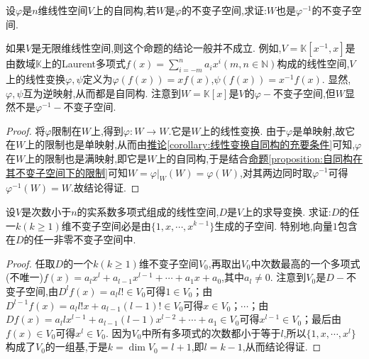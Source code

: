\documentclass[../../main.tex]{subfiles}%
\begin{document}
\begin{proposition}\label{proposition:可逆线性变换的不变子空间仍是其逆的不变子空间}
设\(\varphi\)是\(n\)维线性空间\(V\)上的自同构,若\(W\)是\(\varphi\)的不变子空间,求证:\(W\)也是\(\varphi^{-1}\)的不变子空间.
\end{proposition}
\begin{remark}
如果\(V\)是无限维线性空间,则这个命题的结论一般并不成立. 例如,\(V = \mathbb{K}[x^{-1},x]\)是由数域\(\mathbb{K}\)上的Laurent多项式\(f(x)=\sum_{i = -m}^{n}a_ix^i(m,n\in\mathbb{N})\)构成的线性空间,\(V\)上的线性变换\(\varphi,\psi\)定义为\(\varphi(f(x)) = xf(x)\),\(\psi(f(x)) = x^{-1}f(x)\). 显然,\(\varphi,\psi\)互为逆映射,从而都是自同构. 注意到\(W = \mathbb{K}[x]\)是\(V\)的\(\varphi -\)不变子空间,但\(W\)显然不是\(\varphi^{-1}-\)不变子空间.
\end{remark}
\begin{proof}

将\(\varphi\)限制在\(W\)上,得到$\varphi :W\rightarrow W$.它是\(W\)上的线性变换. 由于\(\varphi\)是单映射,故它在\(W\)上的限制也是单映射,从而由\hyperref[corollary:线性变换自同构的充要条件]{推论\ref{corollary:线性变换自同构的充要条件}}可知,\(\varphi\)在\(W\)上的限制也是满映射,即它是\(W\)上的自同构,于是结合\hyperref[proposition:自同构在其不变子空间下的限制]{命题\ref{proposition:自同构在其不变子空间下的限制}}可知\(W=\varphi |_W\left( W \right) =\varphi \left( W \right) \),对其两边同时取$\varphi ^{-1}$可得$\varphi ^{-1}\left( W \right) =W$.故结论得证.

\end{proof}

\begin{example}
设\(V\)是次数小于\(n\)的实系数多项式组成的线性空间,\(D\)是\(V\)上的求导变换. 求证:\(D\)的任一\(k(k\geqslant  1)\)维不变子空间必是由\(\{1,x,\cdots,x^{k - 1}\}\)生成的子空间. 特别地,向量\(1\)包含在\(D\)的任一非零不变子空间中.
\end{example}
\begin{proof}

任取\(D\)的一个\(k(k\geqslant  1)\)维不变子空间\(V_0\),再取出\(V_0\)中次数最高的一个多项式(不唯一)\(f(x)=a_lx^l + a_{l - 1}x^{l - 1}+\cdots + a_1x + a_0\),其中\(a_l\neq 0\). 注意到\(V_0\)是\(D -\)不变子空间,由\(D^lf(x)=a_ll!\in V_0\)可得\(1\in V_0\)；由\(D^{l - 1}f(x)=a_ll!x + a_{l - 1}(l - 1)!\in V_0\)可得\(x\in V_0\)；\(\cdots\)；由\(Df(x)=a_llx^{l - 1}+a_{l - 1}(l - 1)x^{l - 2}+\cdots + a_1\in V_0\)可得\(x^{l - 1}\in V_0\)；最后由\(f(x)\in V_0\)可得\(x^l\in V_0\). 因为\(V_0\)中所有多项式的次数都小于等于\(l\),所以\(\{1,x,\cdots,x^l\}\)构成了\(V_0\)的一组基,于是\(k = \dim V_0 = l + 1\),即\(l = k - 1\),从而结论得证.

\end{proof}
\end{document}
